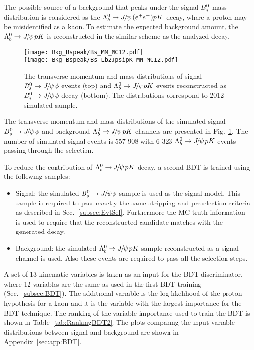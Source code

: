   
  The possible source of a background that peaks under the signal ${{B}^0_{s}}$ mass distribution is considered as the ${{\Lambda}^0_{b}}\rightarrow{\ensuremath{{J\mskip -3mu/\mskip -2mu\psi\mskip 2mu}}}({e^+e^-}) pK$ decay, where a proton may be misidentified as a kaon. To estimate the expected background amount, the ${{\Lambda}^0_{b}}\rightarrow{\ensuremath{{J\mskip -3mu/\mskip -2mu\psi\mskip 2mu}}} pK$ is reconstructed in the similar scheme as the analyzed decay.  
  \begin{figure}[hbt]
  \begin{center}
    \texttt{[image: Bkg\_Bspeak/Bs\_MM\_MC12.pdf]} \\
    \texttt{[image: Bkg\_Bspeak/Bs\_Lb2JpsipK\_MM\_MC12.pdf]}
  \end{center}
  \caption{
   The transverse momentum and mass distributions of signal ${{B}^0_{s}}\rightarrow{\ensuremath{{J\mskip -3mu/\mskip -2mu\psi\mskip 2mu}}}\phi$ events (top) and ${{\Lambda}^0_{b}}\rightarrow{\ensuremath{{J\mskip -3mu/\mskip -2mu\psi\mskip 2mu}}} pK$ events reconstructed as ${{B}^0_{s}}\rightarrow{\ensuremath{{J\mskip -3mu/\mskip -2mu\psi\mskip 2mu}}}\phi$ decay (bottom). The distributions correspond to 2012 simulated sample.   
}
  \label{fig:Bs_MM_MC12}
\end{figure}
  The transverse momentum and mass distributions of the simulated signal ${{B}^0_{s}}\rightarrow{\ensuremath{{J\mskip -3mu/\mskip -2mu\psi\mskip 2mu}}}\phi$ and background ${{\Lambda}^0_{b}}\rightarrow{\ensuremath{{J\mskip -3mu/\mskip -2mu\psi\mskip 2mu}}} pK$ channels are presented in Fig.~\ref{fig:Bs_MM_MC12}. The number of simulated signal events is 557 908 with 6 323 ${{\Lambda}^0_{b}}\rightarrow{\ensuremath{{J\mskip -3mu/\mskip -2mu\psi\mskip 2mu}}} pK$ events passing through the selection.
  
To reduce the contribution of ${{\Lambda}^0_{b}}\rightarrow{\ensuremath{{J\mskip -3mu/\mskip -2mu\psi\mskip 2mu}}} pK$ decay, a second BDT is trained using the following samples:
 \begin{itemize}
   \item Signal: the simulated ${{B}^0_{s}}\rightarrow{\ensuremath{{J\mskip -3mu/\mskip -2mu\psi\mskip 2mu}}}\phi$ sample is used as the signal model. This sample is required to pass exactly the same stripping and preselection criteria as described in Sec.~\ref{subsec:EvtSel}. Furthermore the MC truth information is used to require that the reconstructed candidate matches with the generated decay.
   \item Background: the simulated ${{\Lambda}^0_{b}}\rightarrow{\ensuremath{{J\mskip -3mu/\mskip -2mu\psi\mskip 2mu}}} pK$ sample reconstructed as a signal channel is used. Also these events are required to pass all the selection steps.
  \end{itemize}
 A set of 13 kinematic variables is taken as an input for the BDT discriminator, where 12 variables are the same as used in the first BDT training (Sec.~\ref{subsec:BDT}). The additional variable is the log-likelihood of the proton hypothesis for a kaon and it is the variable with the largest importance for the BDT technique. The ranking of the variable importance used to train the BDT is shown in Table~\ref{tab:RankingBDT2}. The plots comparing the input variable distributions between signal and background are shown in Appendix~\ref{sec:app:BDT}.
 
